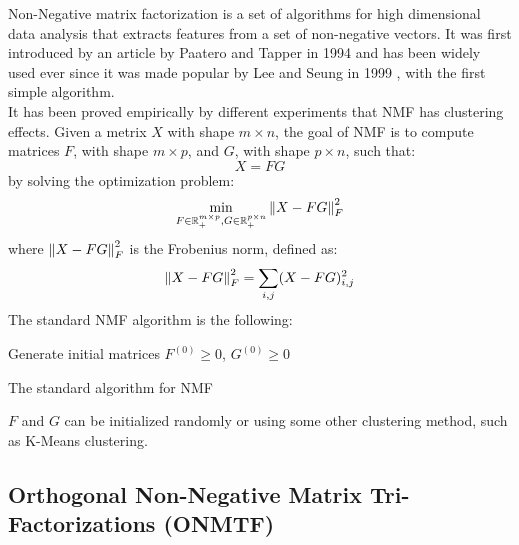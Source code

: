 Non-Negative matrix factorization is a set of algorithms for high dimensional data analysis that extracts features from a set of non-negative vectors. It was first introduced by an article by Paatero and Tapper in 1994 \cite{10.1002/env.3170050203} and has been widely used ever since it was made popular by Lee and Seung in 1999 \cite{10.1038/44565}, with the first simple algorithm.\\
It has been proved empirically by different experiments \cite{10.5555/1005332.1044709, 10.1109/CVPR.2001.990477} that NMF has clustering effects.
Given a metrix $X$ with shape $m \times n$, the goal of NMF is to compute matrices $F$, with shape $m \times p$, and $G$, with shape $p \times n$, such that:
\begin{equation*}
X = FG
\end{equation*}
by solving the optimization problem:
\begin{equation*}
\min_{F \in \mathbb{R}^{m \times p}_+, G \in \mathbb{R}^{p \times n}_+} \left\lVert X - FG\right\rVert_F^2
\end{equation*}
where $\left\lVert X - FG\right\rVert_F^2$ is the Frobenius norm, defined as:
\begin{equation*}
\left\lVert X - FG\right\rVert_F^2 = \sum_{i,j} (X - FG)_{i,j}^2
\end{equation*}
The standard NMF algorithm is the following:
\vskip 0.7cm
\begin{algorithm}[H]
Generate initial matrices $F^{(0)} \geq 0$, $G^{(0)} \geq 0$\;
\caption{The standard algorithm for NMF}
\end{algorithm}
\vskip 0.7cm
$F$ and $G$ can be initialized randomly or using some other clustering method, such as K-Means clustering.


\subsection{Orthogonal Non-Negative Matrix Tri-Factorizations (ONMTF)}


